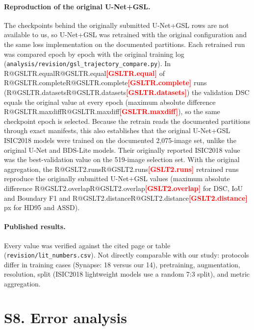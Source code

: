 \documentclass[10pt]{article}
\makeatletter
\newcommand{\R}[1]{\ifcsname R@#1\endcsname\csname R@#1\endcsname\else\textbf{\textcolor{red}{[#1]}}\fi}
\makeatother
\begin{document}
\paragraph{Reproduction of the original U-Net+GSL.} The checkpoints behind the originally submitted U-Net+GSL rows are not available to us, so U-Net+GSL was retrained with the original configuration and the same loss implementation on the documented partitions. Each retrained run was compared epoch by epoch with the original training log (\texttt{analysis/revision/gsl\_trajectory\_compare.py}). In \R{GSLTR.equal} of \R{GSLTR.complete} runs (\R{GSLTR.datasets}) the validation DSC equals the original value at every epoch (maximum absolute difference \R{GSLTR.maxdiff}), so the same checkpoint epoch is selected. Because the retrain reads the documented partitions through exact manifests, this also establishes that the original U-Net+GSL ISIC2018 models were trained on the documented 2,075-image set, unlike the original U-Net and BDS-Lite models. Their originally reported ISIC2018 value was the best-validation value on the 519-image selection set. With the original aggregation, the \R{GSLT2.runs} retrained runs reproduce the originally submitted U-Net+GSL values (maximum absolute difference \R{GSLT2.overlap} for DSC, IoU and Boundary F1 and \R{GSLT2.distance}\,px for HD95 and ASSD).
\begin{table}[ht]\centering
\resizebox{\linewidth}{!}{}
\caption{Retrained U-Net+GSL versus the original training logs (validation DSC as logged during training).}
\end{table}

\paragraph{Published results.} Every value was verified against the cited page or table (\texttt{revision/lit\_numbers.csv}). Not directly comparable with our study: protocols differ in training cases (Synapse: 18 versus our 14), pretraining, augmentation, resolution, split (ISIC2018 lightweight models use a random 7:3 split), and metric aggregation.
\begin{table}[ht]\centering\scriptsize
\resizebox{\linewidth}{!}{}
\caption{Published results under standard protocols.}
\end{table}

\clearpage
\section*{S8. Error analysis}
\end{document}
